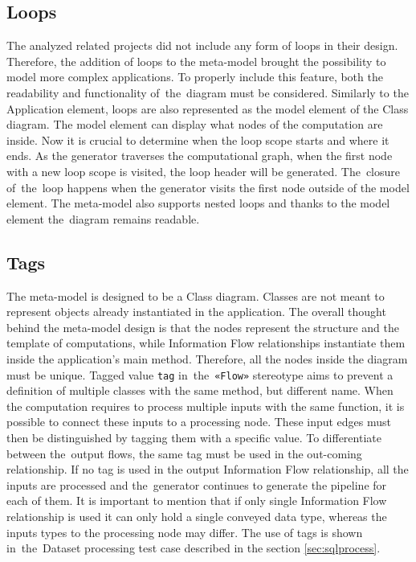 \subsection*{Loops}
The analyzed related projects did not include any form of loops in their design. Therefore, the addition of loops to the meta-model brought the possibility to model more complex applications. To properly include this feature, both the readability and functionality of~the~diagram must be considered. Similarly to the Application element, loops are also represented as the model element of the Class diagram. The model element can display what nodes of the computation are inside. Now it is crucial to determine when the loop scope starts and where it ends. As the generator traverses the computational graph, when the first node with a new loop scope is visited, the loop header will be generated. The~closure of~the~loop happens when the generator visits the first node outside of the model element.  The meta-model also supports nested loops and thanks to the model element the~diagram remains readable. 

\subsection*{Tags}

The meta-model is designed to be a Class diagram. Classes are not meant to represent objects already instantiated in the application. The overall thought behind the meta-model design is that the nodes represent the structure and the template of computations, while Information Flow relationships instantiate them inside the application's main method. Therefore, all the nodes inside the diagram must be unique. Tagged value \texttt{tag} in~the~\texttt{«Flow»} stereotype aims to prevent a definition of multiple classes with the same method, but different name. When the computation requires to process multiple inputs with the same function, it is possible to connect these inputs to a processing node. These input edges must then be distinguished by tagging them with a specific value. To differentiate between the~output flows, the same tag must be used in the out-coming relationship. If no tag is used in the output Information Flow relationship, all the inputs are processed and the~generator continues to generate the pipeline for each of them. It is important to mention that if only single Information Flow relationship is used it can only hold a single conveyed data type, whereas the inputs types to the processing node may differ.  The use of tags is shown in~the~Dataset processing test case described in the section \ref{sec:sqlprocess}.

